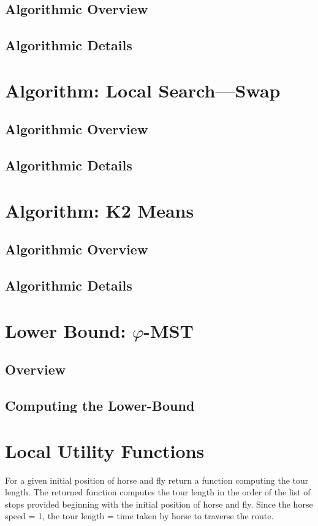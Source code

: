 \documentclass[11.5pt]{report}
\begin{document}
\subsection{Algorithmic Overview}
\subsection{Algorithmic Details}\section{Algorithm: Local Search---Swap}  
\subsection{Algorithmic Overview}
\subsection{Algorithmic Details}
\section{Algorithm: K2 Means}  

\subsection{Algorithmic Overview}
\subsection{Algorithmic Details}

\section{Lower Bound: $\varphi$-MST}

\subsection{Overview}
\subsection{Computing the Lower-Bound}

\section{Local Utility Functions}

\newchunk  For a given initial position of horse and fly
   return a function computing the tour length. 
   The returned function computes the tour length 
   in the order of the list of stops provided beginning 
   with the initial position of horse and fly. Since 
   the horse speed = 1, the tour length = time taken 
   by horse to traverse the route.
\end{document}
